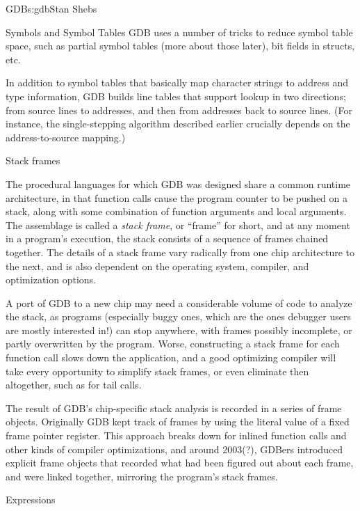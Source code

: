 \begin{aosachapter}{GDB}{s:gdb}{Stan Shebs}
\begin{aosasect2}{Symbols and Symbol Tables}
GDB uses a number of tricks to reduce symbol table space, such as
partial symbol tables (more about those later), bit fields in structs,
etc.

In addition to symbol tables that basically map character strings to
address and type information, GDB builds line tables that support
lookup in two directions; from source lines to addresses, and then
from addresses back to source lines.  (For instance, the
single-stepping algorithm described earlier crucially depends on the
address-to-source mapping.)

\end{aosasect2}

\begin{aosasect2}{Stack frames}

The procedural languages for which GDB was designed share a common
runtime architecture, in that function calls cause the program counter
to be pushed on a stack, along with some combination of function
arguments and local arguments.  The assemblage is called a {\em stack
  frame}, or ``frame'' for short, and at any moment in a program's
execution, the stack consists of a sequence of frames chained
together.  The details of a stack frame vary radically from one chip
architecture to the next, and is also dependent on the operating
system, compiler, and optimization options.

A port of GDB to a new chip may need a considerable volume of code to
analyze the stack, as programs (especially buggy ones, which are the
ones debugger users are mostly interested in!) can stop anywhere, with
frames possibly incomplete, or partly overwritten by the program.
Worse, constructing a stack frame for each function call slows down the
application, and a good optimizing compiler will take every
opportunity to simplify stack frames, or even eliminate then
altogether, such as for tail calls.

The result of GDB's chip-specific stack analysis is recorded in a
series of frame objects.  Originally GDB kept track of frames by using
the literal value of a fixed frame pointer register.  This approach
breaks down for inlined function calls and other kinds of compiler
optimizations, and around 2003(?), GDBers introduced explicit frame
objects that recorded what had been figured out about each frame, and
were linked together, mirroring the program's stack frames.

\end{aosasect2}

\begin{aosasect2}{Expressions}


\end{aosasect2}
\end{aosachapter}
